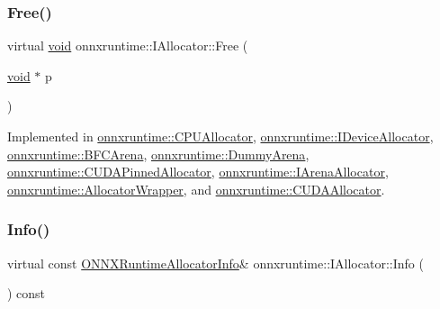 \subsubsection{\texorpdfstring{Free()}{Free()}}
{\footnotesize\ttfamily virtual \mbox{\hyperlink{mlasi_8h_a88f941d423cb2a819b70a1358982b1a6}{void}} onnxruntime\+::\+I\+Allocator\+::\+Free (\begin{DoxyParamCaption}\item[{\mbox{\hyperlink{mlasi_8h_a88f941d423cb2a819b70a1358982b1a6}{void}} $\ast$}]{p }\end{DoxyParamCaption})\hspace{0.3cm}{\ttfamily [pure virtual]}}



Implemented in \mbox{\hyperlink{classonnxruntime_1_1CPUAllocator_affe0e58d7fc048fb2cef9fc6704fdd91}{onnxruntime\+::\+C\+P\+U\+Allocator}}, \mbox{\hyperlink{classonnxruntime_1_1IDeviceAllocator_aeabef1862123ae6d9478199db974e32a}{onnxruntime\+::\+I\+Device\+Allocator}}, \mbox{\hyperlink{classonnxruntime_1_1BFCArena_a92b868aa0f335eafb2ae3542aa87b569}{onnxruntime\+::\+B\+F\+C\+Arena}}, \mbox{\hyperlink{classonnxruntime_1_1DummyArena_a58196d32ed10a9d9aba3681457ec982d}{onnxruntime\+::\+Dummy\+Arena}}, \mbox{\hyperlink{classonnxruntime_1_1CUDAPinnedAllocator_a2d28c8305e862060b9e5337073cda109}{onnxruntime\+::\+C\+U\+D\+A\+Pinned\+Allocator}}, \mbox{\hyperlink{classonnxruntime_1_1IArenaAllocator_a3341fde74c8461678359fb903fe78df3}{onnxruntime\+::\+I\+Arena\+Allocator}}, \mbox{\hyperlink{classonnxruntime_1_1AllocatorWrapper_ac41adbaba7d92b14697b271050d0cab2}{onnxruntime\+::\+Allocator\+Wrapper}}, and \mbox{\hyperlink{classonnxruntime_1_1CUDAAllocator_a72082fdae56347fdc45d4a3ac0f1e498}{onnxruntime\+::\+C\+U\+D\+A\+Allocator}}.

\mbox{\label{classonnxruntime_1_1IAllocator_a384b9f03d2346999b7b9ce3b225982a3}} 
\subsubsection{\texorpdfstring{Info()}{Info()}}
{\footnotesize\ttfamily virtual const \mbox{\hyperlink{structONNXRuntimeAllocatorInfo}{O\+N\+N\+X\+Runtime\+Allocator\+Info}}\& onnxruntime\+::\+I\+Allocator\+::\+Info (\begin{DoxyParamCaption}{ }\end{DoxyParamCaption}) const\hspace{0.3cm}{\ttfamily [pure virtual]}}



